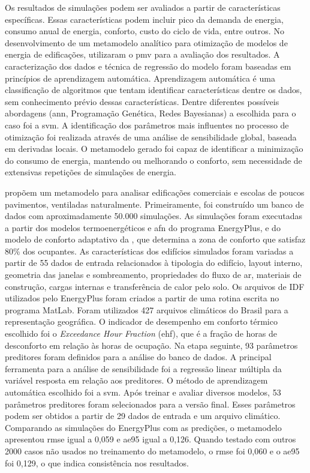 \documentclass[brazil,hardcopy,openany]{ufscthesis} %
\begin{document}
Os resultados de simulações podem ser avaliados a partir de características específicas. Essas características podem incluir pico da demanda de energia, consumo anual de energia, conforto, custo do ciclo de vida, entre outros. No desenvolvimento de um metamodelo analítico para otimização de modelos de energia de edificações,  utilizaram o \acrshort{pmv} para a avaliação dos resultados. A caracterização dos dados e técnica de regressão do modelo foram baseadas em princípios de aprendizagem automática. Aprendizagem automática é uma classificação de algoritmos que tentam identificar características dentre os dados, sem conhecimento prévio dessas características. 
Dentre diferentes possíveis abordagens (\acrshort{ann}, Programação Genética, Redes Bayesianas) a escolhida para o caso foi a \acrshort{svm}. 
A identificação dos parâmetros mais influentes no processo de otimização foi realizada através de uma análise de sensibilidade global, baseada em derivadas locais. O metamodelo gerado foi capaz de identificar a minimização do consumo de energia, mantendo ou melhorando o conforto, sem necessidade de extensivas repetições de simulações de energia.

 propõem um metamodelo para analisar edificações comerciais e escolas de poucos pavimentos, ventiladas naturalmente. Primeiramente, foi construído um banco de dados com aproximadamente 50.000 simulações. As simulações foram executadas a partir dos modelos termoenergéticos e \acrshort{afn} do programa EnergyPlus, e do modelo de conforto adaptativo da  , que determina a zona de conforto que satisfaz 80\% dos ocupantes. As características dos edifícios simulados foram variadas a partir de 55 dados de entrada relacionados à tipologia do edifício, layout interno, geometria das janelas e sombreamento, propriedades do fluxo de ar, materiais de construção, cargas internas e transferência de calor pelo solo. Os arquivos de IDF utilizados pelo EnergyPlus foram criados a partir de uma rotina escrita no programa MatLab. Foram utilizados 427 arquivos climáticos do Brasil para a representação geográfica. 
O indicador de desempenho em conforto térmico escolhido foi o \textit{Exceedance Hour Fraction} (\acrshort{ehf}), que é a fração de horas de desconforto em relação às horas de ocupação. Na etapa seguinte, 93 parâmetros preditores foram definidos para a análise do banco de dados. A principal ferramenta para a análise de sensibilidade foi a regressão linear múltipla da variável resposta em relação aos preditores. O método de aprendizagem automática escolhido foi a \acrshort{svm}. Após treinar e avaliar diversos modelos, 53 parâmetros preditores foram selecionados para a versão final. Esses parâmetros podem ser obtidos a partir de 29 dados de entrada e um arquivo climático. Comparando as simulações do EnergyPlus com as predições, o metamodelo apresentou \acrfull{rmse} igual a 0,059 e \acrfull{ae95} igual a 0,126. Quando testado com outros 2000 casos não usados no treinamento do metamodelo, o \acrshort{rmse} foi 0,060 e o \acrshort{ae95} foi 0,129, o que indica consistência nos resultados. 
\end{document}

